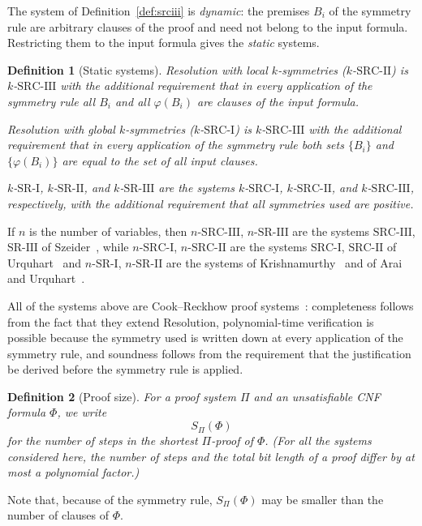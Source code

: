 \documentclass[10pt]{article}
\newtheorem{definition}{Definition}
\newcommand{\SRI}{\text{SR-I}}
\newcommand{\SRII}{\text{SR-II}}
\newcommand{\SRIII}{\text{SR-III}}
\newcommand{\SRCI}{\text{SRC-I}}
\newcommand{\SRCII}{\text{SRC-II}}
\newcommand{\SRCIII}{\text{SRC-III}}
\begin{document}
The system of Definition~\ref{def:srciii} is \emph{dynamic}: the premises
$B_i$ of the symmetry rule are arbitrary clauses of the proof and need not
belong to the input formula. Restricting them to the input formula gives the
\emph{static} systems.

\begin{definition}[Static systems]
\emph{Resolution with local $k$-symmetries} ($k$-$\SRCII$) is
$k$-$\SRCIII$ with the additional requirement that in every application of
the symmetry rule all $B_i$ and all $\varphi(B_i)$ are clauses of the input
formula.

\emph{Resolution with global $k$-symmetries} ($k$-$\SRCI$) is
$k$-$\SRCIII$ with the additional requirement that in every application of
the symmetry rule both sets $\{B_i\}$ and $\{\varphi(B_i)\}$ are equal to the set
of all input clauses.

\emph{$k$-$\SRI$, $k$-$\SRII$, and $k$-$\SRIII$} are the systems
$k$-$\SRCI$, $k$-$\SRCII$, and $k$-$\SRCIII$, respectively, with the
additional requirement that all symmetries used are positive.
\end{definition}

If $n$ is the number of variables, then $n$-$\SRCIII$, $n$-$\SRIII$ are the
systems $\SRCIII$, $\SRIII$ of Szeider~\cite{Szeider05}, while $n$-$\SRCI$,
$n$-$\SRCII$ are the systems $\SRCI$, $\SRCII$ of Urquhart~\cite{Urquhart99}
and $n$-$\SRI$, $n$-$\SRII$ are the systems of
Krishnamurthy~\cite{Krishnamurthy85} and of Arai and Urquhart~\cite{AU00}.

All of the systems above are Cook--Reckhow proof systems~\cite{CR79}:
completeness follows from the fact that they extend Resolution, polynomial-time
verification is possible because the symmetry used is written down at every
application of the symmetry rule, and soundness follows from the requirement
that the justification be derived before the symmetry rule is applied.

\begin{definition}[Proof size]
For a proof system $\Pi$ and an unsatisfiable CNF formula $\Phi$, we write
\[
S_{\Pi}(\Phi)
\]
for the number of steps in the shortest $\Pi$-proof of $\Phi$. (For all the
systems considered here, the number of steps and the total bit length of a
proof differ by at most a polynomial factor.)
\end{definition}

Note that, because of the symmetry rule, $S_{\Pi}(\Phi)$ may be smaller than
the number of clauses of $\Phi$.
\end{document}
